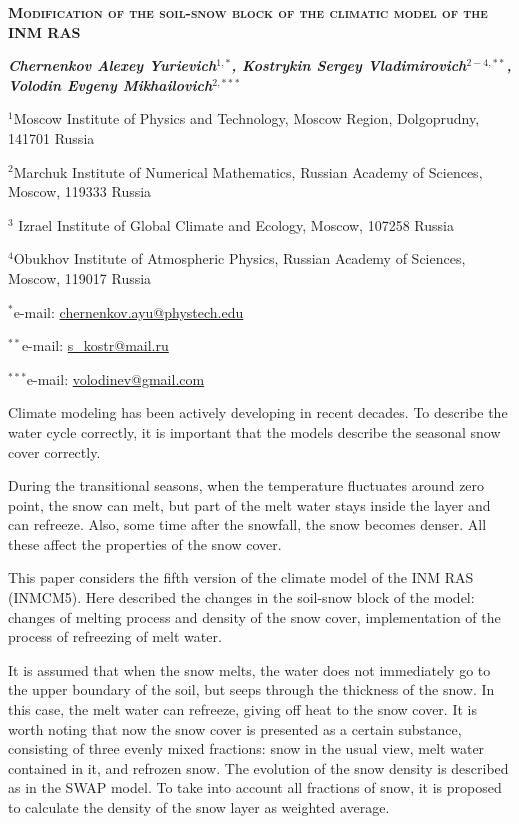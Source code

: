 \documentclass[a4paper, fontsize=12pt]{scrartcl}
\begin{document}
\newpage

\begin{center}
    \Large
    \textbf{\textsc{Modification of the soil-snow block of the climatic model of the INM RAS}}
    \normalsize 
    
    \textbf{\textit{Chernenkov Alexey Yurievich$^{1, *}$, Kostrykin Sergey Vladimirovich$^{2-4, **}$, Volodin Evgeny Mikhailovich$^{2, ***}$}}
    
            $^1$Moscow Institute of Physics and Technology, Moscow Region, Dolgoprudny, 141701 Russia
    
            $^2$Marchuk Institute of Numerical Mathematics, Russian Academy of Sciences, Moscow, 119333 Russia
    
            $^3$ Izrael Institute of Global Climate and Ecology, Moscow, 107258 Russia
    
            $^4$Obukhov Institute of Atmospheric Physics, Russian Academy of Sciences, Moscow, 119017 Russia
    
            $^*$e-mail: \url{chernenkov.ayu@phystech.edu}
    
            $^{**}$e-mail: \url{s_kostr@mail.ru}
            
            $^{***}$e-mail: \url{volodinev@gmail.com}

\end{center}

Climate modeling has been actively developing in recent decades. To  describe the water cycle correctly, it is important that the models describe the seasonal snow cover correctly.

During the transitional seasons, when the temperature fluctuates around zero point, the snow can melt, but part of the melt water stays inside the layer and can refreeze. Also, some time after the snowfall, the snow becomes denser. All these affect the properties of the snow cover.

This paper considers the fifth version of the climate model of the INM RAS (INMCM5). Here described the changes in the soil-snow block of the model: changes of melting process and density of the snow cover,  implementation of the process of refreezing of melt water.

It is assumed that when the snow melts, the water does not immediately go to the upper boundary of the soil, but seeps through the thickness of the snow. In this case, the melt water can refreeze, giving off heat to the snow cover. It is worth noting that now the snow cover is presented as a certain substance, consisting of three evenly mixed fractions: snow in the usual view, melt water contained in it, and refrozen snow. The evolution of the snow density is described as in the SWAP model. To take into account all fractions of snow, it is proposed to calculate the density of the snow layer as weighted average.
\end{document}
